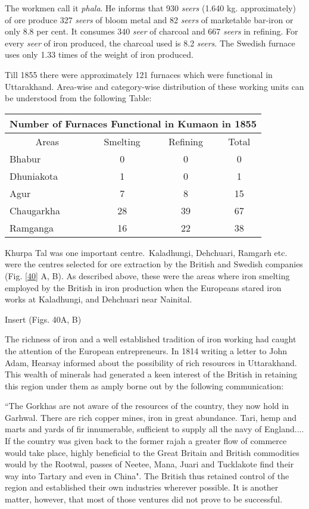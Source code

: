 The workmen call it {\it phala}. He informs that 930 {\it seers} (1.640 kg. approximately) of ore produce 327 {\it seers} of bloom metal and 82 {\it seers} of marketable bar-iron or only 8.8 per cent. It consumes 340 {\it seer} of charcoal and 667 {\it seers} in refining. For every {\it seer} of iron produced, the charcoal used is 8.2 {\it seers}. The Swedish furnace uses only 1.33 times of the weight of iron produced. 

Till 1855 there were approximately 121 furnaces which were functional in Uttarakhand. Area-wise and category-wise distribution of these working units can be understood from the following Table:

\vspace{-.3cm}

{\fontsize{8}{10}\selectfont\begin{longtable}{|l|c|c|c|}
\multicolumn{4}{c}{\textbf{Number of Furnaces Functional in Kumaon in 1855}}\\[2pt]
\hline 
\multicolumn{1}{|c|}{Areas} & Smelting & Refining & Total\\
\hline
Bhabur & 0 & 0 & 0\\
\hline
Dhuniakota & 1 & 0 &1\\
\hline
Agur & 7 & 8 &15\\
\hline
Chaugarkha & 28 & 39 & 67\\
\hline
Ramganga & 16 & 22 & 38\\
\hline
\end{longtable}}

Khurpa Tal was one important centre.~Kaladhungi, Dehchuari, Ramgarh etc. were the centres selected for ore extraction by the British and Swedish companies (Fig. \ref{40} A, B). As described above, these were the areas where iron smelting employed by the British in iron production when the Europeans stared iron works at Kaladhungi, and Dehchuari near Nainital.

Insert (Figs. 40A, B)

The richness of iron and a well established tradition of iron working had caught the attention of the European entrepreneurs. In 1814 writing a letter to John Adam, Hearsay informed about the possibility of rich resources in Uttarakhand. This wealth of minerals had generated a keen interest of the British in retaining this region under them as amply borne out by the following communication:

\footnotesize{``The Gorkhas are not aware of the resources of the country, they now hold in Garhwal. There are rich copper mines, iron in great abundance. Tari, hemp and marts and yards of fir innumerable, sufficient to supply all the navy of England.... If the country was given back to the former rajah a greater flow of commerce would take place, highly beneficial to the Great Britain and British commodities would by the Rootwal, passes of Neetee, Mana, Juari and Tucklakote find their way into Tartary and even in China".} The British thus retained control of the region and established their own industries wherever possible. It is another matter, however, that most of those ventures did not prove to be successful.

